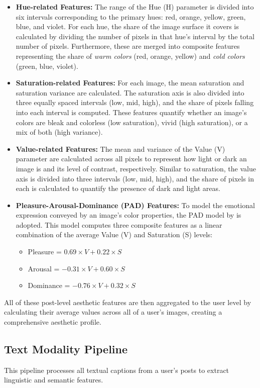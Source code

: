 \begin{itemize} \item \textbf{Hue-related Features:} The range of the Hue (H) parameter is divided into six intervals corresponding to the primary hues: red, orange, yellow, green, blue, and violet. For each hue, the share of the image surface it covers is calculated by dividing the number of pixels in that hue's interval by the total number of pixels. Furthermore, these are merged into composite features representing the share of \textit{warm colors} (red, orange, yellow) and \textit{cold colors} (green, blue, violet). \item \textbf{Saturation-related Features:} For each image, the mean saturation and saturation variance are calculated. The saturation axis is also divided into three equally spaced intervals (low, mid, high), and the share of pixels falling into each interval is computed. These features quantify whether an image's colors are bleak and colorless (low saturation), vivid (high saturation), or a mix of both (high variance). \item \textbf{Value-related Features:} The mean and variance of the Value (V) parameter are calculated across all pixels to represent how light or dark an image is and its level of contrast, respectively. Similar to saturation, the value axis is divided into three intervals (low, mid, high), and the share of pixels in each is calculated to quantify the presence of dark and light areas. \item \textbf{Pleasure-Arousal-Dominance (PAD) Features:} To model the emotional expression conveyed by an image's color properties, the PAD model by \citet{Valdez1994} is adopted. This model computes three composite features as a linear combination of the average Value (V) and Saturation (S) levels: \begin{itemize} \item Pleasure = $0.69 \times V + 0.22 \times S$ \item Arousal = $-0.31 \times V + 0.60 \times S$ \item Dominance = $-0.76 \times V + 0.32 \times S$ \end{itemize} \end{itemize} 

All of these post-level aesthetic features are then aggregated to the user level by calculating their average values across all of a user's images, creating a comprehensive aesthetic profile.


\subsection{Text Modality Pipeline}
This pipeline processes all textual captions from a user's posts to extract linguistic and semantic features.

